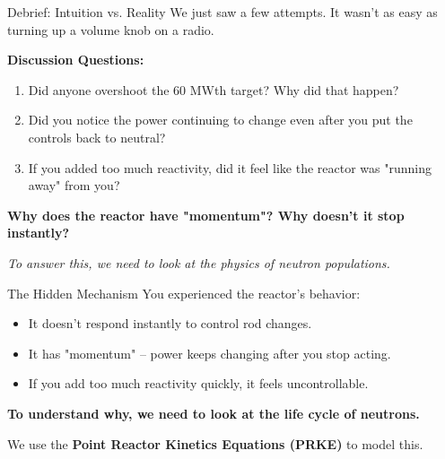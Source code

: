 \documentclass[aspectratio=169]{beamer}
\begin{document}
\begin{frame}[allowframebreaks]{Debrief: Intuition vs. Reality}
    We just saw a few attempts. It wasn't as easy as turning up a volume knob on a radio.

    \vspace{1em}

    \textbf{Discussion Questions:}
    \begin{enumerate}
        \item Did anyone overshoot the 60 MWth target? Why did that happen?
        \item Did you notice the power continuing to change even after you put the controls back to neutral?
        \item If you added too much reactivity, did it feel like the reactor was "running away" from you?
    \end{enumerate}

    \vspace{1em}
    \begin{center}
        \textbf{Why does the reactor have "momentum"? Why doesn't it stop instantly?}
        
        \textit{To answer this, we need to look at the physics of neutron populations.}
    \end{center}
\end{frame}

\begin{frame}[allowframebreaks]{The Hidden Mechanism}
    You experienced the reactor's behavior:
    \begin{itemize}
        \item It doesn't respond instantly to control rod changes.
        \item It has "momentum" – power keeps changing after you stop acting.
        \item If you add too much reactivity quickly, it feels uncontrollable.
    \end{itemize}

    \vspace{2em}
    \centering
    \textbf{To understand why, we need to look at the life cycle of neutrons.}
    
    We use the \textbf{Point Reactor Kinetics Equations (PRKE)} to model this.
\end{frame}
\end{document}
